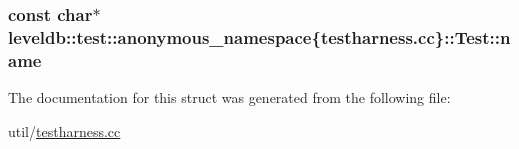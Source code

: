 \subsubsection[{name}]{\setlength{\rightskip}{0pt plus 5cm}const char$\ast$ leveldb\+::test\+::anonymous\+\_\+namespace\{testharness.\+cc\}\+::Test\+::name}\label{structleveldb_1_1test_1_1anonymous__namespace_02testharness_8cc_03_1_1_test_a1f65afaab3ef9024191b33938f2f5f4d}


The documentation for this struct was generated from the following file\+:\begin{DoxyCompactItemize}
\item 
util/\hyperlink{testharness_8cc}{testharness.\+cc}\end{DoxyCompactItemize}
